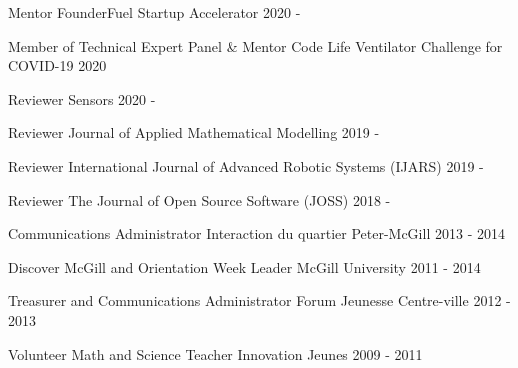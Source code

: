 \begin{cvhonors}

\cvhonor
{Mentor}
{FounderFuel Startup Accelerator}
{}
{2020 - }

\cvhonor
{Member of Technical Expert Panel \& Mentor}
{Code Life Ventilator Challenge for COVID-19}
{}
{2020}

\cvhonor
{Reviewer}
{Sensors}
{}
{2020 - }

\cvhonor
{Reviewer}
{Journal of Applied Mathematical Modelling}
{}
{2019 - }

\cvhonor
{Reviewer}
{International Journal of Advanced Robotic Systems (IJARS)}
{}
{2019 - }

\cvhonor
{Reviewer}
{The Journal of Open Source Software (JOSS)}
{}
{2018 - }

\cvhonor
{Communications Administrator}
{Interaction du quartier Peter-McGill}
{}
{2013 - 2014}

\cvhonor
{Discover McGill and Orientation Week Leader}
{McGill University}
{}
{2011 - 2014}

\cvhonor
{Treasurer and Communications Administrator}
{Forum Jeunesse Centre-ville}
{}
{2012 - 2013}

\cvhonor
{Volunteer Math and Science Teacher}
{Innovation Jeunes}
{}
{2009 - 2011}

\end{cvhonors}
